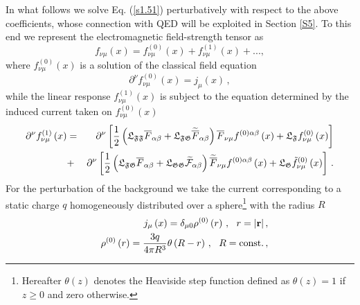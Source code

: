 \documentclass[12pt]{article}
\begin{document}
In what follows we solve Eq. (\ref{s1.51}) perturbatively with respect to
the above coefficients, whose connection with QED will be exploited in
Section \ref{S5}. To this end we represent the electromagnetic
field-strength tensor as%
\begin{equation}
f_{\nu \mu }\left( x\right) =f_{\nu \mu }^{\left( 0\right) }\left( x\right)
+f_{\nu \mu }^{\left( 1\right) }\left( x\right) +...,  \label{pert}
\end{equation}%
where $f_{\nu \mu }^{\left( 0\right) }\left( x\right) $ is a solution of the
classical field equation%
\begin{equation*}
\partial ^{\nu }f_{\nu \mu }^{\left( 0\right) }\left( x\right) =j_{\mu
}\left( x\right) \,,
\end{equation*}%
while the linear response $f_{\nu \mu }^{\left( 1\right) }\left( x\right) $
is subject to the equation determined by the induced current taken on $%
f_{\nu \mu }^{\left( 0\right) }\left( x\right) $%
\begin{eqnarray}
\partial ^{\nu }f_{\nu \mu }^{\left( 1\right) }\left( x\right) &=&\partial
^{\nu }\left[ \frac{1}{2}\left( \mathfrak{L}_{\mathfrak{FF}}\overline{F}%
_{\alpha \beta }+\mathfrak{L}_{\mathfrak{FG}}\widetilde{\overline{F}}%
_{\alpha \beta }\right) \overline{F}_{\nu \mu }f^{\left( 0\right) \alpha
\beta }\left( x\right) +\mathfrak{L}_{\mathfrak{F}}f_{\nu \mu }^{\left(
0\right) }\left( x\right) \right]  \notag \\
&+&\partial ^{\nu }\left[ \frac{1}{2}\left( \mathfrak{L}_{\mathfrak{FG}}%
\overline{F}_{\alpha \beta }+\mathfrak{L}_{\mathfrak{GG}}\widetilde{\mathcal{%
F}}_{\alpha \beta }\right) \widetilde{\overline{F}}_{\nu \mu }f^{\left(
0\right) \alpha \beta }\left( x\right) +\mathfrak{L}_{\mathfrak{G}}\tilde{f}%
_{\nu \mu }^{\left( 0\right) }\left( x\right) \right] \,.  \label{17}
\end{eqnarray}%
For the perturbation of the background we take the current corresponding to
a static charge $q$ homogeneously distributed over a sphere\footnote{%
Hereafter $\theta \left( z\right) $ denotes the Heaviside step function
defined as $\theta \left( z\right) =1$ if $z\geq 0$ and zero otherwise.}
with the radius $R$%
\begin{eqnarray}
&&j_{\mu }\left( x\right) =\delta _{\mu 0}\rho ^{\left( 0\right) }\left(
r\right) \,,\ \ r=|\mathbf{r|\,,}  \notag \\
&&\rho ^{\left( 0\right) }\left( r\right) =\frac{3q}{4\pi R^{3}}\theta
\left( R-r\right) \,,\ \ R=\mathrm{const.}\,,  \label{const charge}
\end{eqnarray}%
\end{document}
